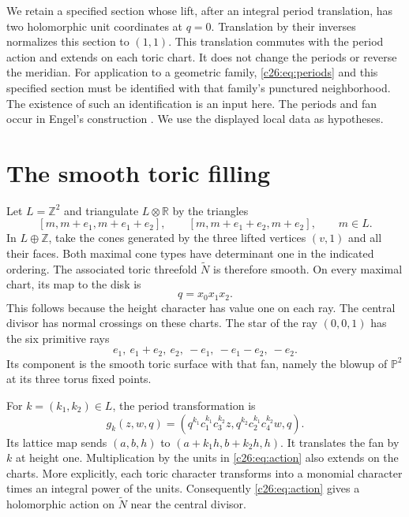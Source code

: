 We retain a specified section whose lift, after an integral period
translation, has two holomorphic unit coordinates at $q=0$.
Translation by their inverses normalizes this section to $(1,1)$.
This translation commutes with the period action and extends on each
toric chart. It does not change the periods or reverse the meridian.
For application to a geometric family, \eqref{c26:eq:periods} and this
specified section must be identified with that family's punctured
neighborhood. The existence of such an identification is an input here.
The periods and fan occur in Engel's construction
\cite[Propositions 2.7--2.9, pp.~5--7]{CuspEngel}.
We use the displayed local data as hypotheses.

\section{The smooth toric filling}

Let $L=\mathbb Z^2$ and triangulate $L\otimes\mathbb R$ by the triangles
\[
[m,m+e_1,m+e_1+e_2],\qquad
[m,m+e_1+e_2,m+e_2],\qquad m\in L.
\]
In $L\oplus\mathbb Z$, take the cones generated by the three lifted
vertices $(v,1)$ and all their faces.
Both maximal cone types have determinant one in the indicated ordering.
The associated toric threefold $\widetilde N$ is therefore smooth.
On every maximal chart, its map to the disk is
\begin{equation}\label{c26:eq:chart}
q=x_0x_1x_2.
\end{equation}
This follows because the height character has value one on each ray.
The central divisor has normal crossings on these charts.
The star of the ray $(0,0,1)$ has the six primitive rays
\[
e_1,\ e_1+e_2,\ e_2,\ -e_1,\ -e_1-e_2,\ -e_2.
\]
Its component is the smooth toric surface with that fan, namely the
blowup of $\mathbb P^2$ at its three torus fixed points.

For $k=(k_1,k_2)\in L$, the period transformation is
\begin{equation}\label{c26:eq:action}
g_k(z,w,q)=
\left(q^{k_1}c_1^{k_1}c_3^{k_2}z,
q^{k_2}c_2^{k_1}c_4^{k_2}w,q\right).
\end{equation}
Its lattice map sends $(a,b,h)$ to $(a+k_1h,b+k_2h,h)$.
It translates the fan by $k$ at height one.
Multiplication by the units in \eqref{c26:eq:action} also extends on the
charts. More explicitly, each toric character transforms into a monomial
character times an integral power of the units.
Consequently \eqref{c26:eq:action} gives a holomorphic action on
$\widetilde N$ near the central divisor.

